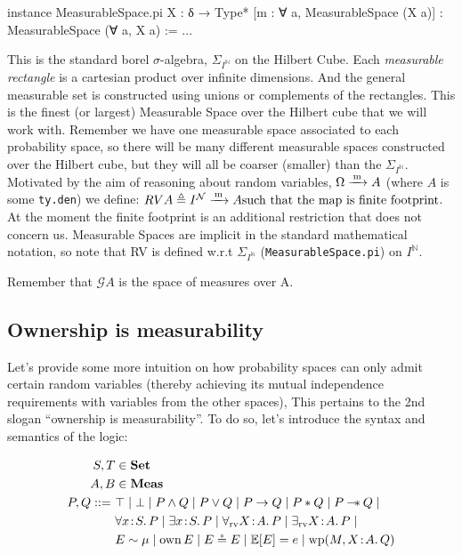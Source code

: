 \begin{leancode}
instance MeasurableSpace.pi {X : δ → Type*} [m : ∀ a, MeasurableSpace (X a)]
    : MeasurableSpace (∀ a, X a) := ...
\end{leancode}

This is the standard borel $\sigma$-algebra, $\Sigma_{I^\mathbb{N}}$ on the Hilbert Cube. Each \emph{measurable rectangle} is a cartesian product over infinite dimensions. And the general measurable set is
constructed using unions or complements of the rectangles. This is the finest (or largest) Measurable Space over the Hilbert cube that we will work with. Remember we have one measurable
space associated to each probability space, so there will be many different measurable spaces constructed over the Hilbert cube, but they will all be coarser (smaller) than the
$\Sigma_{I^\mathbb{N}}$.
Motivated by the aim of reasoning about random variables, $ \Omega \xrightarrow{\,\mathrm{m}\,} A$ (where $A$ is some \texttt{ty.den}) we define:
$RV A \triangleq I^{\mathcal{N}} \xrightarrow{\,\mathrm{m}\,} A \text{such that the map is finite footprint}$. At the moment the finite footprint is an additional restriction that does not
concern us. Measurable Spaces are implicit in the standard mathematical notation, so note that RV is defined w.r.t $\Sigma_{I^\mathbb{N}}$ (\texttt{MeasurableSpace.pi}) on $I^{\mathbb{N}}$.



Remember that $\mathcal{G} A$ is the space of measures over A.

\subsection{Ownership is measurability}
Let's provide some more intuition on how probability spaces can only admit certain random variables (thereby achieving its mutual independence requirements with variables from the other spaces),
This pertains to the 2nd slogan ``ownership is measurability''. To do so, let's introduce the 
syntax and semantics of the logic:

\[
\begin{aligned}
S,T &\in \mathbf{Set} \\
A,B &\in \mathbf{Meas} \\
P,Q ::=~& \top \mid \bot \mid P \land Q \mid P \lor Q \mid P \to Q \mid P \ast Q \mid P \wand Q \mid {} \\
& \forall x\!:\!S.\,P \mid \exists x\!:\!S.\,P \mid \forall_{\mathrm{rv}} X\!:\!A.\,P \mid \exists_{\mathrm{rv}} X\!:\!A.\,P \mid {} \\
& E \sim \mu \mid \mathrm{own}\,E \mid E \circeq E \mid \mathbb{E}[E] = e \mid \mathrm{wp}(M,X\!:\!A.\,Q)
\end{aligned}
\]

